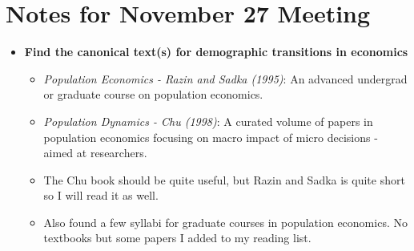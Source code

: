 \documentclass{article}
\begin{document}
{}

\section*{Notes for November 27 Meeting}

\begin{itemize}
\item \textbf{Find the canonical text(s) for demographic transitions in economics}
\begin{itemize}



\item \textit{Population Economics - Razin and Sadka (1995)}: An advanced undergrad or graduate course on population economics.
\item \textit{Population Dynamics - Chu (1998)}: A curated volume of papers in population economics focusing on macro impact of micro decisions - aimed at researchers.

\item The Chu book should be quite useful, but Razin and Sadka is quite short so I will read it as well.

\item Also found a few syllabi for graduate courses in population economics. No textbooks but some papers I added to my reading list.

\end{itemize}


\end{itemize}
\end{document}
